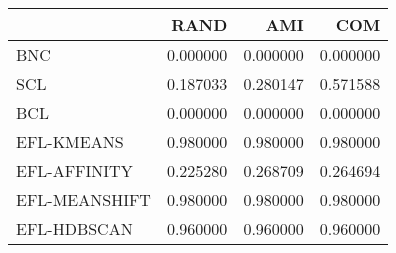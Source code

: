 \begin{tabular}{lrrr}
\toprule
 & RAND & AMI & COM \\
\midrule
BNC & 0.000000 & 0.000000 & 0.000000 \\
SCL & 0.187033 & 0.280147 & 0.571588 \\
BCL & 0.000000 & 0.000000 & 0.000000 \\
EFL-KMEANS & 0.980000 & 0.980000 & 0.980000 \\
EFL-AFFINITY & 0.225280 & 0.268709 & 0.264694 \\
EFL-MEANSHIFT & 0.980000 & 0.980000 & 0.980000 \\
EFL-HDBSCAN & 0.960000 & 0.960000 & 0.960000 \\
\bottomrule
\end{tabular}
